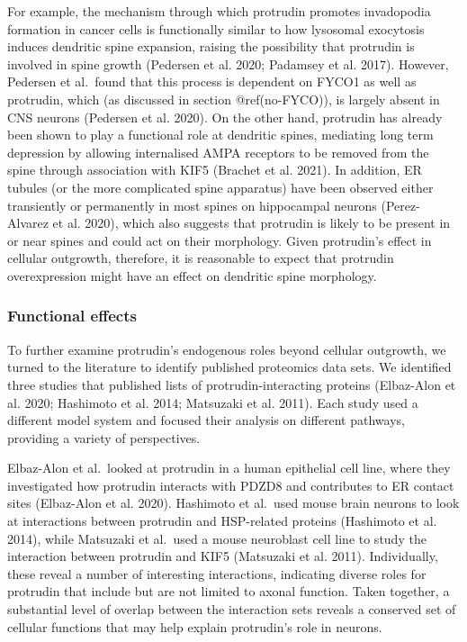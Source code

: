 \documentclass[
]{article}
\begin{document}
For example, the mechanism through which protrudin promotes invadopodia
formation in cancer cells is functionally similar to how lysosomal
exocytosis induces dendritic spine expansion, raising the possibility
that protrudin is involved in spine growth (Pedersen et al. 2020;
Padamsey et al. 2017). However, Pedersen et al.~found that this process
is dependent on FYCO1 as well as protrudin, which (as discussed in
section @ref(no-FYCO)), is largely absent in CNS neurons (Pedersen et
al. 2020). On the other hand, protrudin has already been shown to play a
functional role at dendritic spines, mediating long term depression by
allowing internalised AMPA receptors to be removed from the spine
through association with KIF5 (Brachet et al. 2021). In addition, ER
tubules (or the more complicated spine apparatus) have been observed
either transiently or permanently in most spines on hippocampal neurons
(Perez-Alvarez et al. 2020), which also suggests that protrudin is
likely to be present in or near spines and could act on their
morphology. Given protrudin's effect in cellular outgrowth, therefore,
it is reasonable to expect that protrudin overexpression might have an
effect on dendritic spine morphology.

\hypertarget{functional-effects}{%
\subsubsection{Functional effects}\label{functional-effects}}

To further examine protrudin's endogenous roles beyond cellular
outgrowth, we turned to the literature to identify published proteomics
data sets. We identified three studies that published lists of
protrudin-interacting proteins (Elbaz-Alon et al. 2020; Hashimoto et al.
2014; Matsuzaki et al. 2011). Each study used a different model system
and focused their analysis on different pathways, providing a variety of
perspectives.

Elbaz-Alon et al.~looked at protrudin in a human epithelial cell line,
where they investigated how protrudin interacts with PDZD8 and
contributes to ER contact sites (Elbaz-Alon et al. 2020). Hashimoto et
al.~used mouse brain neurons to look at interactions between protrudin
and HSP-related proteins (Hashimoto et al. 2014), while Matsuzaki et
al.~used a mouse neuroblast cell line to study the interaction between
protrudin and KIF5 (Matsuzaki et al. 2011). Individually, these reveal a
number of interesting interactions, indicating diverse roles for
protrudin that include but are not limited to axonal function. Taken
together, a substantial level of overlap between the interaction sets
reveals a conserved set of cellular functions that may help explain
protrudin's role in neurons.
\end{document}
